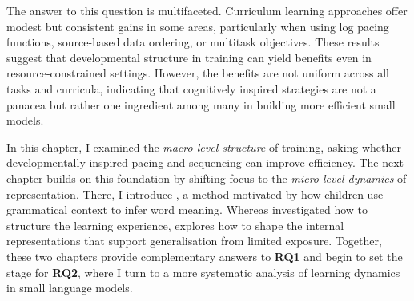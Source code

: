 The answer to this question is multifaceted. Curriculum learning approaches offer modest but consistent gains in some areas, particularly when using log pacing functions, source-based data ordering, or multitask objectives. These results suggest that developmental structure in training can yield benefits even in resource-constrained settings. However, the benefits are not uniform across all tasks and curricula, indicating that cognitively inspired strategies are not a panacea but rather one ingredient among many in building more efficient small models. 



In this chapter, I examined the \emph{macro-level structure} of training, asking whether developmentally inspired pacing and sequencing can improve efficiency. The next chapter builds on this foundation by shifting focus to the \emph{micro-level dynamics} of representation. There, I introduce \smoothing, a method motivated by how children use grammatical context to infer word meaning. Whereas \climb investigated how to structure the learning experience, \smoothing explores how to shape the internal representations that support generalisation from limited exposure. Together, these two chapters provide complementary answers to \textbf{RQ1} and begin to set the stage for \textbf{RQ2}, where I turn to a more systematic analysis of learning dynamics in small language models.



